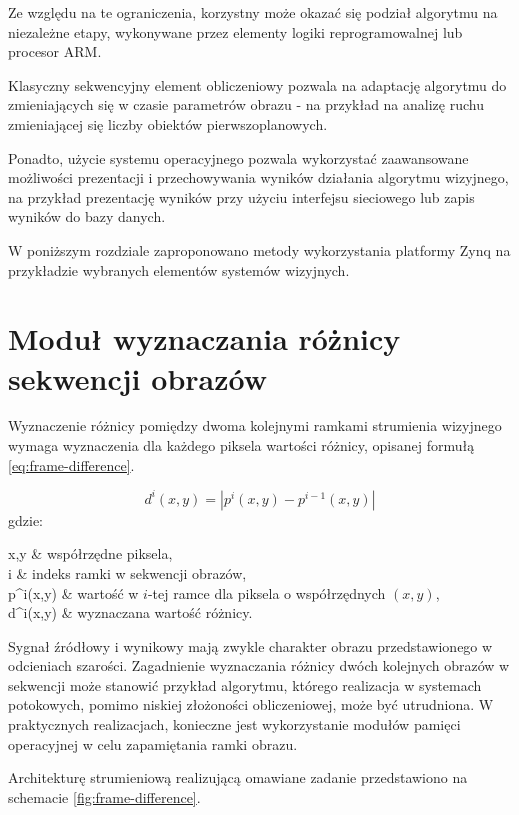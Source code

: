 Ze względu na te ograniczenia, korzystny może okazać się podział algorytmu na niezależne etapy, wykonywane przez elementy logiki reprogramowalnej lub procesor ARM. 

Klasyczny sekwencyjny element obliczeniowy pozwala na adaptację algorytmu do zmieniających się w czasie parametrów obrazu - na przykład na analizę ruchu zmieniającej się liczby obiektów pierwszoplanowych.

Ponadto, użycie systemu operacyjnego pozwala wykorzystać zaawansowane możliwości prezentacji i przechowywania wyników działania algorytmu wizyjnego, na przykład prezentację wyników przy użyciu interfejsu sieciowego lub zapis wyników do bazy danych.

W poniższym rozdziale zaproponowano metody wykorzystania platformy Zynq na przykładzie wybranych elementów systemów wizyjnych.

\section{Moduł wyznaczania różnicy sekwencji obrazów}

Wyznaczenie różnicy pomiędzy dwoma kolejnymi ramkami strumienia wizyjnego wymaga wyznaczenia dla każdego piksela wartości różnicy, opisanej formułą \ref{eq:frame-difference}.

\begin{equation}
\label{eq:frame-difference}
d^i(x,y) = | p^i(x,y) - p^{i-1}(x,y) |
\end{equation}
gdzie:
\begin{conditions}
	x,y & współrzędne piksela, \\
	i & indeks ramki w sekwencji obrazów, \\
	p^i(x,y) & wartość w $i$-tej ramce dla piksela o współrzędnych $(x,y)$, \\
	d^i(x,y) & wyznaczana wartość różnicy. \\
\end{conditions}

Sygnał źródłowy i wynikowy  mają zwykle charakter obrazu przedstawionego w odcieniach szarości. 
Zagadnienie wyznaczania różnicy dwóch kolejnych obrazów w sekwencji może stanowić przykład algorytmu, którego realizacja w systemach potokowych, pomimo niskiej złożoności obliczeniowej, może być utrudniona. W praktycznych realizacjach, konieczne jest wykorzystanie modułów pamięci operacyjnej w celu zapamiętania ramki obrazu.

Architekturę strumieniową realizującą omawiane zadanie przedstawiono na schemacie \ref{fig:frame-difference}.

